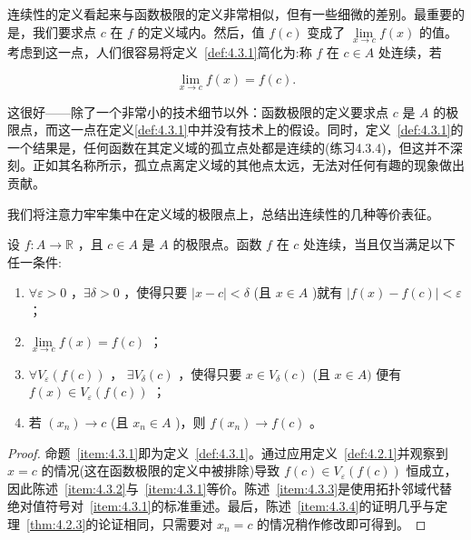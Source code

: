 连续性的定义看起来与函数极限的定义非常相似，但有一些细微的差别。最重要的是，我们要求点 \(c\) 在 \(f\) 的定义域内。然后，值 \(f\left( c\right)\) 变成了 \(\mathop{\lim }\limits_{{x \rightarrow  c}}f\left( x\right)\) 的值。考虑到这一点，人们很容易将定义~\ref{def:4.3.1}简化为:称 \(f\) 在 \(c \in  A\) 处连续，若

\[
\mathop{\lim }\limits_{{x \rightarrow  c}}f\left( x\right)  = f\left( c\right) .
\]

这很好——除了一个非常小的技术细节以外：函数极限的定义要求点 \(c\) 是 \(A\) 的极限点，而这一点在定义\ref{def:4.3.1}中并没有技术上的假设。同时，定义~\ref{def:4.3.1}的一个结果是，任何函数在其定义域的孤立点处都是连续的(练习4.3.4)，但这并不深刻。正如其名称所示，孤立点离定义域的其他点太远，无法对任何有趣的现象做出贡献。

我们将注意力牢牢集中在定义域的极限点上，总结出连续性的几种等价表征。


\begin{Thm}[连续性的表征]
  \label{thm:4.3.2}
  设 \(f : A \rightarrow  \mathbb{R}\) ，且 \(c \in  A\) 是 \(A\) 的极限点。函数 \(f\) 在 \(c\) 处连续，当且仅当满足以下任一条件:

  \begin{enumerate}[label = (\roman*)]
  \item\label{item:4.3.1}  \(\forall \varepsilon  > 0\) ，\(\exists \delta  > 0\) ，使得只要 \(\left| {x - c}\right|  < \delta\) (且 \(x \in  A\) )就有 \(\left| {f\left( x\right)  - f\left( c\right) }\right|  < \varepsilon\)；
  \item\label{item:4.3.2}\(\mathop{\lim }\limits_{{x \rightarrow  c}}f\left( x\right)  = f\left( c\right)\) ；
  \item \label{item:4.3.3} \(\forall{V}_{\varepsilon }\left( {f\left( c\right) }\right)\) ， \(\exists {V}_{\delta }\left( c\right)\) ，使得只要 \(x \in  {V}_{\delta }\left( c\right)\) (且 \(x \in  A)\) 便有 \(f\left( x\right)  \in  {V}_{\varepsilon }\left( {f\left( c\right) }\right)\) ；
  \item \label{item:4.3.4}若 \(\left( {x}_{n}\right)  \rightarrow  c\) (且 \({x}_{n} \in  A\) )，则 \(f\left( {x}_{n}\right)  \rightarrow  f\left( c\right)\) 。
  \end{enumerate}
\end{Thm}

\begin{proof}
  命题~\ref{item:4.3.1}即为定义~\ref{def:4.3.1}。通过应用定义~\ref{def:4.2.1}并观察到 \(x = c\) 的情况(这在函数极限的定义中被排除)导致 \(f\left( c\right)  \in  {V}_{\varepsilon }\left( {f\left( c\right) }\right)\) 恒成立，因此陈述~\ref{item:4.3.2}与~\ref{item:4.3.1}等价。陈述~\ref{item:4.3.3}是使用拓扑邻域代替绝对值符号对~\ref{item:4.3.1}的标准重述。最后，陈述~\ref{item:4.3.4}的证明几乎与定理~\ref{thm:4.2.3}的论证相同，只需要对 \({x}_{n} = c\) 的情况稍作修改即可得到。
\end{proof}

